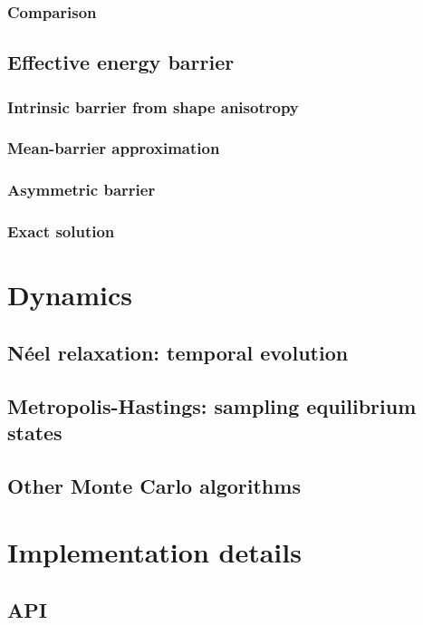 \subsubsection{Comparison}
\subsection{Effective energy barrier}
\subsubsection{Intrinsic barrier from shape anisotropy}
\subsubsection{Mean-barrier approximation} %
\subsubsection{Asymmetric barrier}
\subsubsection{Exact solution} %

\section{Dynamics}
\subsection{N\'eel relaxation: temporal evolution}
\subsection{Metropolis-Hastings: sampling equilibrium states}
\subsection{Other Monte Carlo algorithms} %

\section{Implementation details}
\subsection{API} %
